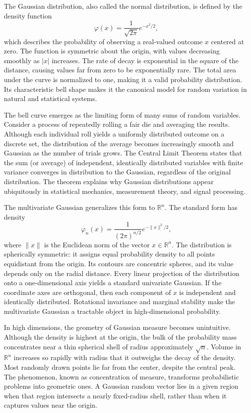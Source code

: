 The Gaussian distribution, also called the normal distribution, is defined by the density function
\[
\varphi(x) = \frac{1}{\sqrt{2\pi}} e^{-x^2/2},
\]
which describes the probability of observing a real-valued outcome \( x \) centered at zero. The function is symmetric about the origin, with values decreasing smoothly as \( |x| \) increases. The rate of decay is exponential in the square of the distance, causing values far from zero to be exponentially rare. The total area under the curve is normalized to one, making it a valid probability distribution. Its characteristic bell shape makes it the canonical model for random variation in natural and statistical systems.

The bell curve emerges as the limiting form of many sums of random variables. Consider a process of repeatedly rolling a fair die and averaging the results. Although each individual roll yields a uniformly distributed outcome on a discrete set, the distribution of the average becomes increasingly smooth and Gaussian as the number of trials grows. The Central Limit Theorem states that the sum (or average) of independent, identically distributed variables with finite variance converges in distribution to the Gaussian, regardless of the original distribution. The theorem explains why Gaussian distributions appear ubiquitously in statistical mechanics, measurement theory, and signal processing.

The multivariate Gaussian generalizes this form to \( \mathbb{R}^n \). The standard form has density
\[
\varphi_n(x) = \frac{1}{(2\pi)^{n/2}} e^{-\|x\|^2/2},
\]
where \( \|x\| \) is the Euclidean norm of the vector \( x \in \mathbb{R}^n \). The distribution is spherically symmetric: it assigns equal probability density to all points equidistant from the origin. Its contours are concentric spheres, and its value depends only on the radial distance. Every linear projection of the distribution onto a one-dimensional axis yields a standard univariate Gaussian. If the coordinate axes are orthogonal, then each component of \( x \) is independent and identically distributed. Rotational invariance and marginal stability make the multivariate Gaussian a tractable object in high-dimensional probability.

In high dimensions, the geometry of Gaussian measure becomes unintuitive. Although the density is highest at the origin, the bulk of the probability mass concentrates near a thin spherical shell of radius approximately \( \sqrt{n} \). Volume in \( \mathbb{R}^n \) increases so rapidly with radius that it outweighs the decay of the density. Most randomly drawn points lie far from the center, despite the central peak. The phenomenon, known as concentration of measure, transforms probabilistic problems into geometric ones. A Gaussian random vector lies in a given region when that region intersects a nearly fixed-radius shell, rather than when it captures values near the origin.

